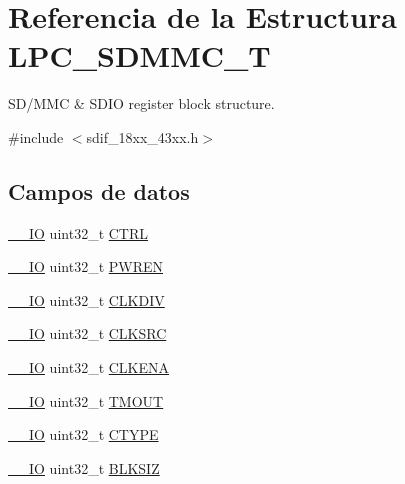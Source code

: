 \hypertarget{struct_l_p_c___s_d_m_m_c___t}{}\section{Referencia de la Estructura L\+P\+C\+\_\+\+S\+D\+M\+M\+C\+\_\+T}
\label{struct_l_p_c___s_d_m_m_c___t}


S\+D/\+M\+MC \& S\+D\+IO register block structure.  




{\ttfamily \#include $<$sdif\+\_\+18xx\+\_\+43xx.\+h$>$}

\subsection*{Campos de datos}
\begin{DoxyCompactItemize}
\item 
\hyperlink{core__sc300_8h_aec43007d9998a0a0e01faede4133d6be}{\+\_\+\+\_\+\+IO} uint32\+\_\+t \hyperlink{struct_l_p_c___s_d_m_m_c___t_a15fc8d35f045f329b80c544bef35ff64}{C\+T\+RL}
\item 
\hyperlink{core__sc300_8h_aec43007d9998a0a0e01faede4133d6be}{\+\_\+\+\_\+\+IO} uint32\+\_\+t \hyperlink{struct_l_p_c___s_d_m_m_c___t_a4013fc9eef95c3aaafd95aee438455c6}{P\+W\+R\+EN}
\item 
\hyperlink{core__sc300_8h_aec43007d9998a0a0e01faede4133d6be}{\+\_\+\+\_\+\+IO} uint32\+\_\+t \hyperlink{struct_l_p_c___s_d_m_m_c___t_a2a33dba1349d1ebe45133cb2789a5307}{C\+L\+K\+D\+IV}
\item 
\hyperlink{core__sc300_8h_aec43007d9998a0a0e01faede4133d6be}{\+\_\+\+\_\+\+IO} uint32\+\_\+t \hyperlink{struct_l_p_c___s_d_m_m_c___t_ae916d4c8d22c8fc2956d6627034aba64}{C\+L\+K\+S\+RC}
\item 
\hyperlink{core__sc300_8h_aec43007d9998a0a0e01faede4133d6be}{\+\_\+\+\_\+\+IO} uint32\+\_\+t \hyperlink{struct_l_p_c___s_d_m_m_c___t_a46083fe8ee07b66ddbe4bc7873cc4d63}{C\+L\+K\+E\+NA}
\item 
\hyperlink{core__sc300_8h_aec43007d9998a0a0e01faede4133d6be}{\+\_\+\+\_\+\+IO} uint32\+\_\+t \hyperlink{struct_l_p_c___s_d_m_m_c___t_a84a02a884f64aec38f149cefa595b7bf}{T\+M\+O\+UT}
\item 
\hyperlink{core__sc300_8h_aec43007d9998a0a0e01faede4133d6be}{\+\_\+\+\_\+\+IO} uint32\+\_\+t \hyperlink{struct_l_p_c___s_d_m_m_c___t_a55514debfb2b8e5a15b9c0b25820b0a6}{C\+T\+Y\+PE}
\item 
\hyperlink{core__sc300_8h_aec43007d9998a0a0e01faede4133d6be}{\+\_\+\+\_\+\+IO} uint32\+\_\+t \hyperlink{struct_l_p_c___s_d_m_m_c___t_abe0b30c390d137cd035dd6c0cc52297d}{B\+L\+K\+S\+IZ}

\end{DoxyCompactItemize}
